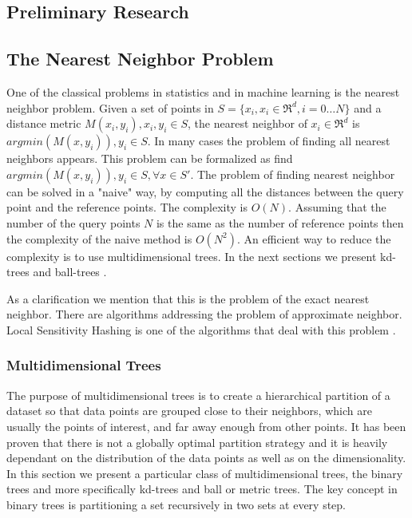\documentclass[12pt,letterpaper,doublespaced,ETD,dvips,proposal]{gtthesis}
\begin{document}
\begin{Body}
\section{Preliminary Research}
\label{prelim}
\subsection{The Nearest Neighbor Problem}
\label{The_Nearest_Neighbor_Problem}

One of the classical problems in statistics and in machine learning
is the nearest neighbor problem. Given a set of points in $S =
\{x_i, x_i\in\Re^d, i=0\dots N\}$ and a distance metric $M(x_i, y_i),
x_i, y_i \in S$,  the nearest neighbor of $x_i \in \Re^d$ is
$argmin(M(x, y_i)), y_i \in S$. In many cases the problem of finding
all nearest neighbors appears. This problem can be formalized as
find $argmin(M(x, y_i)), y_i \in S, \forall x \in S'$. The problem
of finding nearest neighbor can be solved in a "naive" way, by
computing all the distances between the query point and the
reference points. The complexity is $O(N)$. Assuming that the number
of the query points $N$ is the same as the number of reference
points then the complexity of the naive method is $O(N^2)$. An
efficient way to reduce the complexity is to use multidimensional
trees. In the next sections we present kd-trees \cite{moore-tutorial}
and ball-trees \cite{moore2000ahu}.

As a clarification we mention that this is the problem of the exact
nearest neighbor. There are algorithms addressing the problem of
approximate neighbor. Local Sensitivity Hashing is one of the
algorithms that deal with this problem \cite{datar2004lsh}.

\subsubsection{Multidimensional Trees}
\label{Multidimensional_Trees}

The purpose of multidimensional trees is to create a hierarchical
partition of a dataset so that data points are grouped close to
their neighbors, which are usually the points of interest, and far
away enough from other points. It has been proven that there is not
a globally optimal partition strategy \cite{gyorfi2002dft}
and it is heavily dependant on the distribution of the data points
as well as on the dimensionality. In this section we present a particular
 class of multidimensional
trees, the binary trees and more specifically kd-trees and ball or
metric trees. The key concept in binary trees is partitioning a set
recursively in two sets at every step.


\end{Body}
\end{document}
